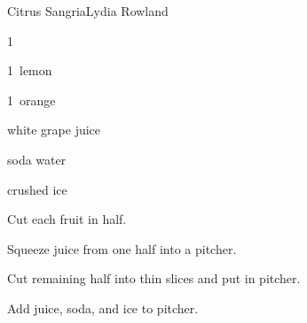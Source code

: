 \begin{recipe}{Citrus Sangria}{Lydia Rowland}{}

\begin{ingredients}
\item 1~
\item 1~lemon
\item 1~orange
\item {} white grape juice
\item {} soda water
\item crushed ice
\end{ingredients}

\begin{directions}
\item Cut each fruit in half.
\item Squeeze juice from one half into a pitcher.
\item Cut remaining half into thin slices and put in pitcher.
\item Add juice, soda, and ice to pitcher.
\end{directions}

\end{recipe}
